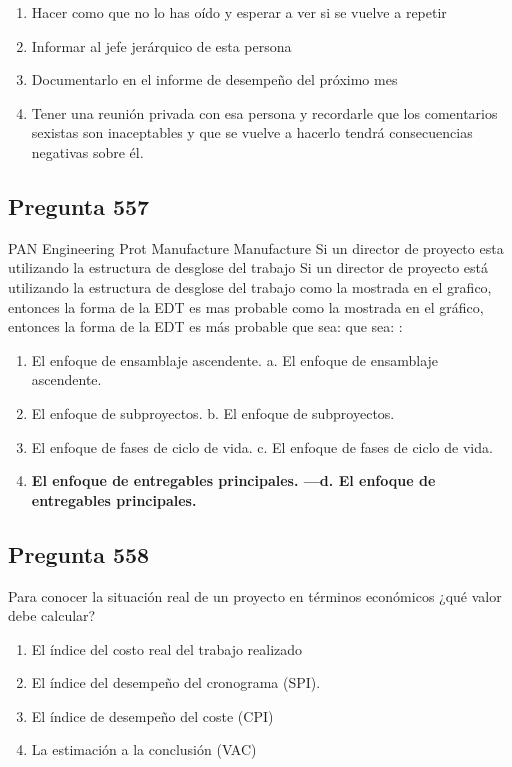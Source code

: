 \documentclass[11pt,a4paper]{article}
\begin{document}
\begin{enumerate}[label=\alph*)]
  \item Hacer como que no lo has oído y esperar a ver si se vuelve a repetir
  \item Informar al jefe jerárquico de esta persona
  \item Documentarlo en el informe de desempeño del próximo mes
  \item Tener una reunión privada con esa persona y recordarle que los comentarios sexistas son inaceptables y que se vuelve a hacerlo tendrá consecuencias negativas sobre él.
\end{enumerate}

\subsection*{Pregunta 557}
PAN Engineering Prot Manufacture Manufacture Si un director de proyecto esta utilizando la estructura de desglose del trabajo Si un director de proyecto está utilizando la estructura de desglose del trabajo como la mostrada en el grafico, entonces la forma de la EDT es mas probable como la mostrada en el gráfico, entonces la forma de la EDT es más probable que sea: que sea: :

\begin{enumerate}[label=\alph*)]
  \item El enfoque de ensamblaje ascendente. a. El enfoque de ensamblaje ascendente.
  \item El enfoque de subproyectos. b. El enfoque de subproyectos.
  \item El enfoque de fases de ciclo de vida. c. El enfoque de fases de ciclo de vida.
  \item \textbf{El enfoque de entregables principales. —d. El enfoque de entregables principales.}
\end{enumerate}

\subsection*{Pregunta 558}
Para conocer la situación real de un proyecto en términos económicos ¿qué valor debe calcular?

\begin{enumerate}[label=\alph*)]
  \item El índice del costo real del trabajo realizado
  \item El índice del desempeño del cronograma (SPI).
  \item El índice de desempeño del coste (CPI)
  \item La estimación a la conclusión (VAC)
\end{enumerate}
\end{document}

